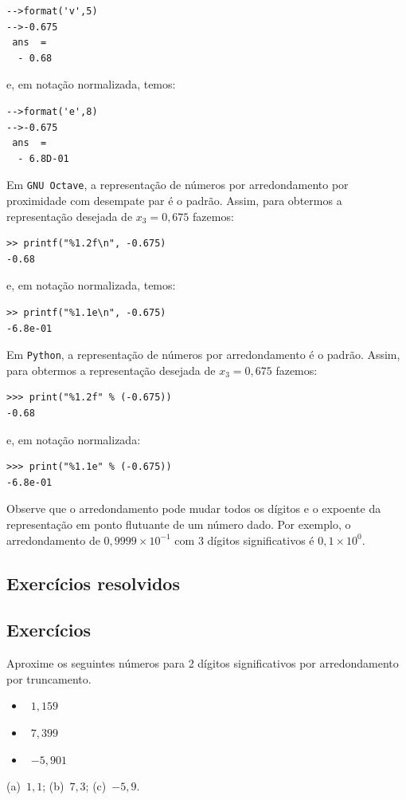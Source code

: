 \begin{sol}
\begin{itemize}
\begin{verbatim}
-->format('v',5)
-->-0.675
 ans  =
  - 0.68
\end{verbatim}
e, em notação normalizada, temos:
\begin{verbatim}
-->format('e',8)
-->-0.675
 ans  =
  - 6.8D-01
\end{verbatim}
\fi
\ifisoctave
Em \verb+GNU Octave+, a representação de números por arredondamento por proximidade com desempate par é o padrão. Assim, para obtermos a representação desejada de $x_3 = 0,675$ fazemos:
\begin{verbatim}
>> printf("%1.2f\n", -0.675)
-0.68
\end{verbatim}
e, em notação normalizada, temos:
\begin{verbatim}
>> printf("%1.1e\n", -0.675)
-6.8e-01
\end{verbatim}
\fi
\ifispython
Em \verb+Python+, a representação de números por arredondamento é o padrão. Assim, para obtermos a representação desejada de $x_3 = 0,675$ fazemos:
\begin{verbatim}
>>> print("%1.2f" % (-0.675))
-0.68
\end{verbatim}
e, em notação normalizada:
\begin{verbatim}
>>> print("%1.1e" % (-0.675))
-6.8e-01
\end{verbatim}
\fi
  \end{itemize}
\end{sol}

\begin{obs}
  Observe que o arredondamento pode mudar todos os dígitos e o expoente da representação em ponto flutuante de um número dado. Por exemplo, o arredondamento de $0,9999\times 10^{-1}$ com $3$ dígitos significativos é $0,1\times 10^{0}$.
\end{obs}

\subsection*{Exercícios resolvidos}

\emconstrucao

\subsection*{Exercícios}

\begin{exer}
  Aproxime os seguintes números para 2 dígitos significativos por arredondamento por truncamento.
  \begin{itemize}
  \item[(a)]~$1,159$
  \item[(b)]~$7,399$
  \item[(c)]~$-5,901$
  \end{itemize}
\end{exer}
\begin{resp}
  (a)~$1,1$; (b)~$7,3$; (c)~$-5,9$.
\end{resp}


